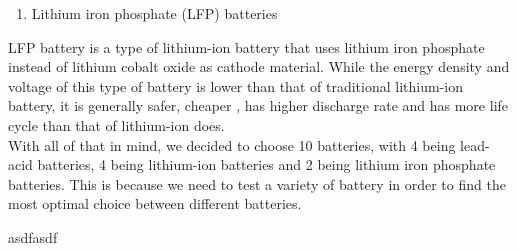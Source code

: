 \begin{enumerate}[resume]
    \item Lithium iron phosphate (LFP) batteries
\end{enumerate}
LFP battery is a type of lithium-ion battery that uses lithium iron phosphate instead of lithium cobalt oxide as cathode material. While the energy density and voltage of this type of battery is lower than that of traditional lithium-ion battery, it is generally safer, cheaper , has higher discharge rate and has more life cycle than that of lithium-ion does.\cite{wiki:lfp_battery}\\ 

With all of that in mind, we decided to choose 10 batteries, with 4 being lead-acid batteries, 4 being lithium-ion batteries and 2 being lithium iron phosphate batteries. This is because we need to test a variety of battery in order to find the most optimal choice between different batteries.
\newpage

asdfasdf